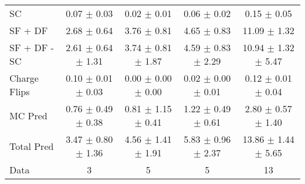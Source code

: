 \begin{tabular}{l|cccc}
                                 SC &  0.07 $\pm$  0.03 &  0.02 $\pm$  0.01 &  0.06 $\pm$  0.02 &  0.15 $\pm$  0.05 \\
                            SF + DF &  2.68 $\pm$  0.64 &  3.76 $\pm$  0.81 &  4.65 $\pm$  0.83 & 11.09 $\pm$  1.32 \\
\hline
                       SF + DF - SC &  2.61 $\pm$  0.64 $\pm$  1.31 &  3.74 $\pm$  0.81 $\pm$  1.87 &  4.59 $\pm$  0.83 $\pm$  2.29 & 10.94 $\pm$  1.32 $\pm$  5.47 \\
\hline\hline
                       Charge Flips &  0.10 $\pm$  0.01 $\pm$  0.03 &  0.00 $\pm$  0.00 $\pm$  0.00 &  0.02 $\pm$  0.00 $\pm$  0.01 &  0.12 $\pm$  0.01 $\pm$  0.04 \\
\hline
                            MC Pred &  0.76 $\pm$  0.49 $\pm$  0.38 &  0.81 $\pm$  1.15 $\pm$  0.41 &  1.22 $\pm$  0.49 $\pm$  0.61 &  2.80 $\pm$  0.57 $\pm$  1.40 \\
\hline
                         Total Pred &  3.47 $\pm$  0.80 $\pm$  1.36 &  4.56 $\pm$  1.41 $\pm$  1.91 &  5.83 $\pm$  0.96 $\pm$  2.37 & 13.86 $\pm$  1.44 $\pm$  5.65 \\
\hline\hline
                               Data &     3 &     5 &     5 &    13 \\
\hline\hline
\end{tabular}

